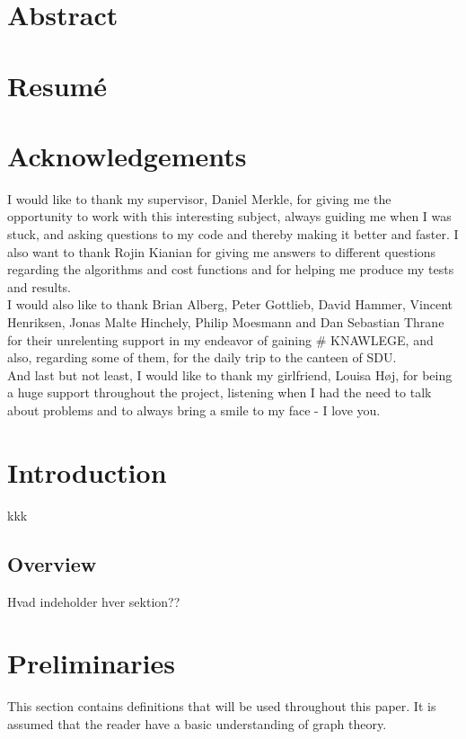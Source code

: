 \documentclass[a4paper,10pt,titlepage]{paper}
\begin{document}
\begin{titlepage}
\end{titlepage}

\vfill
\section*{Abstract}

\section*{Resumé}
\newpage

\tableofcontents
\newpage


\section{Acknowledgements}
I would like to thank my supervisor, Daniel Merkle, for giving me the opportunity to work with this interesting subject, always guiding me when I was stuck, and asking questions to my code and thereby making it better and faster. I also want to thank Rojin Kianian for giving me answers to different questions regarding the algorithms and cost functions and for helping me produce my tests and results.\\
I would also like to thank Brian Alberg, Peter Gottlieb, David Hammer, Vincent Henriksen, Jonas Malte Hinchely, Philip Moesmann and Dan Sebastian Thrane for their unrelenting support in my endeavor of gaining \# KNAWLEGE, and also, regarding some of them, for the daily trip to the canteen of SDU.\\
And last but not least, I would like to thank my girlfriend, Louisa Høj, for being a huge support throughout the project, listening when I had the need to talk about problems and to always bring a smile to my face - I love you.
\section{Introduction}
kkk \cite{Grzybowski}\\
\subsection{Overview}
Hvad indeholder hver sektion??

\section{Preliminaries}

This section contains definitions that will be used throughout this paper. It is assumed that the reader have a basic understanding of graph theory. \\
\end{document}
